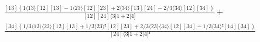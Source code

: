 \documentclass[varwidth, border=5pt]{standalone}
\begin{document}
\begin{my}
$\begin{gathered}
\scriptscriptstyle\frac{[13](1⟨13⟩[12][13]-1⟨23⟩[12][23]+2⟨34⟩[13][24]-2/3⟨34⟩[12][34])}{[12][24]⟨3|1+2|4]} +\\
\scriptscriptstyle\frac{[34](1/3⟨13⟩⟨23⟩[12][13]+1/3⟨23⟩²[12][23]+2/3⟨23⟩⟨34⟩[12][34]-1/3⟨34⟩²[14][34])}{[24]⟨3|1+2|4]²} \phantom{+}
\end{gathered}$
\end{my}
\end{document}
